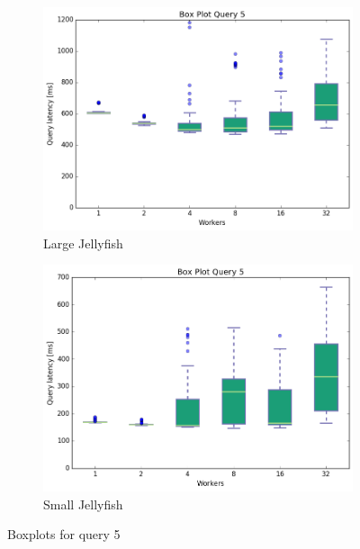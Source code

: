 \documentclass[11pt,singlecolumn]{scrartcl}
\begin{document}
\begin{figure}
\begin{subfigure}[b]{0.475\textwidth}
        \centering 
        \includegraphics[width=\textwidth]{boxesjl/q5}
        \caption[]%
        {{\small Large Jellyfish}}    
        \label{fig:mean and std of net34}
    \end{subfigure}
    \quad
    \begin{subfigure}[b]{0.475\textwidth}   
        \centering 
        \includegraphics[width=\textwidth]{boxesjs/q5}
        \caption[]%
        {{\small Small Jellyfish}}    
        \label{fig:mean and std of net44}
    \end{subfigure}
    \caption[  Boxplots for query 5 ]
    {\small Boxplots for query 5} 
    \label{fig:mean and std of nets}
\end{figure}
\clearpage
\end{document}
